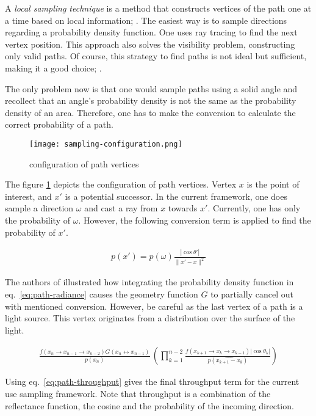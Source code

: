A \textit{local sampling technique} is a method that constructs vertices of the path one at a time based on local information; \cite{veach_robust_1997}.
The easiest way is to sample directions regarding a probability density function.
One uses ray tracing to find the next vertex position.
This approach also solves the visibility problem, constructing only valid paths.
Of course, this strategy to find paths is not ideal but sufficient, making it a good choice; \cite{pharr_physically_2017}.

The only problem now is that one would sample paths using a solid angle and recollect that an angle's probability density is not the same as the probability density of an area.
Therefore, one has to make the conversion to calculate the correct probability of a path.

\begin{figure}[h]
\centering
\texttt{[image: sampling-configuration.png]}
\caption[]{configuration of path vertices}
\label{fig:path-vertices}
\end{figure}

The figure \ref{fig:path-vertices} depicts the configuration of path vertices.
Vertex $x$ is the point of interest, and $x'$ is a potential successor.
In the current framework, one does sample a direction $\omega$ and cast a ray from $x$ towards $x'$.
Currently, one has only the probability of $\omega$. 
However, the following conversion term is applied to find the probability of $x'$.

\begin{align*}
p(x')=p(\omega)\frac{|\cos\theta'|}{\|x'-x\|^2}
\end{align*}

The authors of \cite{pharr_physically_2017} illustrated how integrating the probability density function in eq.~\ref{eq:path-radiance} causes the geometry function $G$ to partially cancel out with mentioned conversion.
However, be careful as the last vertex of a path is a light source.
This vertex originates from a distribution over the surface of the light.

\begin{align*}
\frac{f(x_{n}\rightarrow x_{n-1}\rightarrow x_{n-2})G(x_n\leftrightarrow x_{n-1})}{p(x_n)}\,\left(\prod_{k=1}^{n-2}\frac{f(x_{k+1}\rightarrow x_{k}\rightarrow x_{k-1})|\cos\theta_{k}|}{p(\widehat{x_{k+1}-x_{k}})}\right)
\end{align*}

Using eq.~\ref{eq:path-throughput} gives the final throughput term for the current use sampling framework.
Note that throughput is a combination of the reflectance function, the cosine and the probability of the incoming direction.

